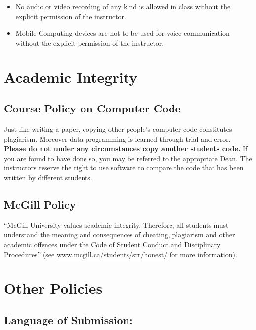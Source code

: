 \documentclass[11pt,]{article}
\begin{document}
\begin{itemize}
\itemsep1pt\parskip0pt
\item
  No audio or video recording of any kind is allowed in class without
  the explicit permission of the instructor.
\item
  Mobile Computing devices are not to be used for voice communication
  without the explicit permission of the instructor.
\end{itemize}

\section{Academic Integrity}\label{academic-integrity}

\subsection{Course Policy on Computer
Code}\label{course-policy-on-computer-code}

Just like writing a paper, copying other people's computer code
constitutes plagiarism. Moreover data programming is learned through
trial and error. \textbf{Please do not under any circumstances copy
another students code.} If you are found to have done so, you may be
referred to the appropriate Dean. The instructors reserve the right to
use software to compare the code that has been written by different
students.

\subsection{McGill Policy}\label{mcgill-policy}

``McGill University values academic integrity. Therefore, all students
must understand the meaning and consequences of cheating, plagiarism and
other academic offences under the Code of Student Conduct and
Disciplinary Procedures'' (see \url{www.mcgill.ca/students/srr/honest/}
for more information).

\section{Other Policies}\label{other-policies}

\subsection{Language of Submission:}\label{language-of-submission}
\end{document}
